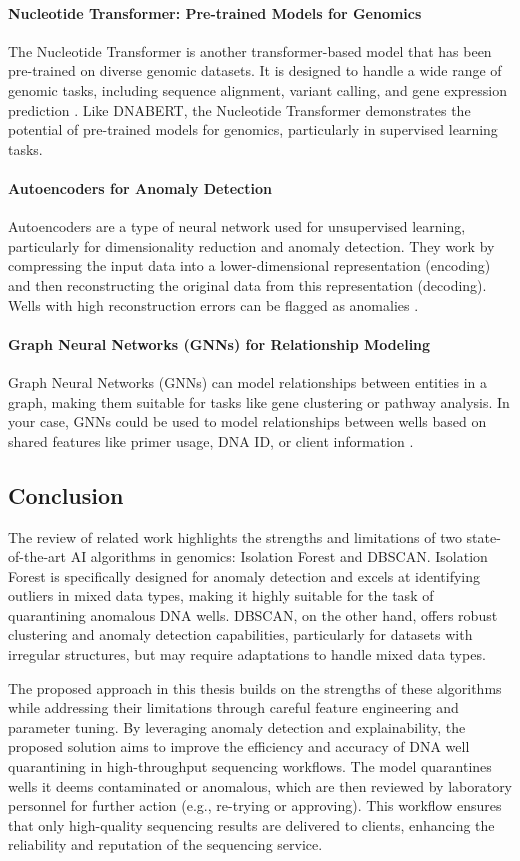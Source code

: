 \paragraph{Nucleotide Transformer: Pre-trained Models for Genomics}
The Nucleotide Transformer is another transformer-based model that has been pre-trained on diverse genomic datasets. It is designed to handle a wide range of genomic tasks, including sequence alignment, variant calling, and gene expression prediction \cite{dalla2023nucleotide}. Like DNABERT, the Nucleotide Transformer demonstrates the potential of pre-trained models for genomics, particularly in supervised learning tasks.

\paragraph{Autoencoders for Anomaly Detection}
Autoencoders are a type of neural network used for unsupervised learning, particularly for dimensionality reduction and anomaly detection. They work by compressing the input data into a lower-dimensional representation (encoding) and then reconstructing the original data from this representation (decoding). Wells with high reconstruction errors can be flagged as anomalies \cite{kingma2013autoencoding}.

\paragraph{Graph Neural Networks (GNNs) for Relationship Modeling}
Graph Neural Networks (GNNs) can model relationships between entities in a graph, making them suitable for tasks like gene clustering or pathway analysis. In your case, GNNs could be used to model relationships between wells based on shared features like primer usage, DNA ID, or client information \cite{kipf2016semi}.
\subsection{Conclusion}
The review of related work highlights the strengths and limitations of two state-of-the-art AI algorithms in genomics: Isolation Forest and DBSCAN. Isolation Forest is specifically designed for anomaly detection and excels at identifying outliers in mixed data types, making it highly suitable for the task of quarantining anomalous DNA wells. DBSCAN, on the other hand, offers robust clustering and anomaly detection capabilities, particularly for datasets with irregular structures, but may require adaptations to handle mixed data types.

The proposed approach in this thesis builds on the strengths of these algorithms while addressing their limitations through careful feature engineering and parameter tuning. By leveraging anomaly detection and explainability, the proposed solution aims to improve the efficiency and accuracy of DNA well quarantining in high-throughput sequencing workflows. The model quarantines wells it deems contaminated or anomalous, which are then reviewed by laboratory personnel for further action (e.g., re-trying or approving). This workflow ensures that only high-quality sequencing results are delivered to clients, enhancing the reliability and reputation of the sequencing service.